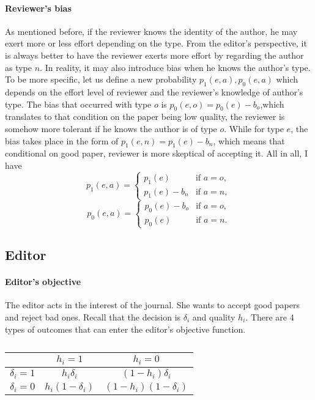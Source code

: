 \documentclass[12pt]{article}
\begin{document}
\paragraph{Reviewer's bias}
As mentioned before, if the reviewer knows the identity of the author, he may
exert more or less effort depending on the type. From the editor's perspective,
it is always better to have the reviewer exerts more effort by regarding the
author as type $n$. In reality, it may also introduce bias when he knows the
author's type. To be more specific, let us define a new probability
$p_1(e,a),p_0(e,a)$ which depends on the effort level of reviewer and the
reviewer's knowledge of author's type. The bias that occurred with type $o$ is
$p_0(e,o)=p_0(e)-b_o$,which translates to that condition on the paper being low
quality, the reviewer is somehow more tolerant if he knows the author is of
type $o$. While for type $e$, the bias takes place in the form of
$p_1(e,n)=p_1(e)-b_n$, which means that conditional on good paper, reviewer is
more skeptical of accepting it. All in all, I have
\[
    p_1(e,a) =
    \begin{cases}
        p_1(e)       & \text{if } a = o , \\
        p_1(e) - b_n & \text{if } a = n,
    \end{cases}
\]
\[
    p_0(e,a) =
    \begin{cases}
        p_0(e) - b_o & \text{if } a=o,    \\
        p_0(e)       & \text{if } a = n .
    \end{cases}
\]
\subsection{Editor}
\paragraph{Editor's objective}
The editor acts in the interest of the journal. She wants to accept good papers
and reject bad ones. Recall that the decision is $\delta_i$ and quality $h_i$.
There are 4 types of outcomes that can enter the editor's objective function.
\begin{table}[!htbp]
    \centering
    \begin{tabular}{c|c|c}
        \toprule
                     & $h_i=1$           & $h_i=0$               \\
        \midrule
        $\delta_i=1$ & $h_i\delta_i$     & $(1-h_i)\delta_i$     \\
        $\delta_i=0$ & $h_i(1-\delta_i)$ & $(1-h_i)(1-\delta_i)$ \\
        \bottomrule
    \end{tabular}
    \caption{}
    \label{tab:editor_objective}
\end{table}
\end{document}
